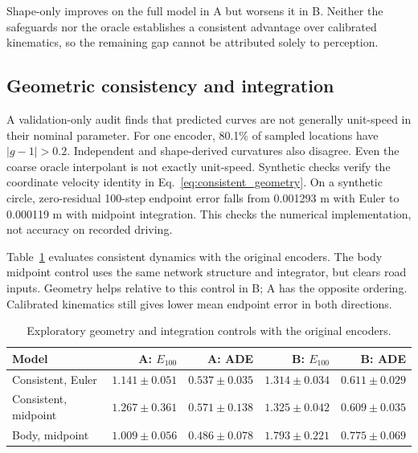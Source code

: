 \documentclass[preprint,12pt]{elsarticle}
\begin{document}
Shape-only improves on the full model in A but worsens it in B. Neither the
safeguards nor the oracle establishes a consistent advantage over calibrated
kinematics, so the remaining gap cannot be attributed solely to perception.

\subsection{Geometric consistency and integration}
A validation-only audit finds that predicted curves are not generally unit-speed
in their nominal parameter. For one encoder, 80.1\% of sampled locations have
$|g-1|>0.2$. Independent and shape-derived curvatures also disagree. Even the
coarse oracle interpolant is not exactly unit-speed. Synthetic checks verify
the coordinate velocity identity in Eq.~\eqref{eq:consistent_geometry}.
On a synthetic circle, zero-residual 100-step endpoint error falls from
0.001293 m with Euler to 0.000119 m with midpoint integration. This checks the
numerical implementation, not accuracy on recorded driving.

Table~\ref{tab:geometry} evaluates consistent dynamics with the original encoders.
The body midpoint control uses the same network structure and integrator, but
clears road inputs. Geometry helps relative to this control in B; A has the
opposite ordering. Calibrated kinematics still gives lower mean endpoint error
in both directions.
\begin{table}[t]
\centering
\caption{Exploratory geometry and integration controls with the original encoders.}
\label{tab:geometry}
\footnotesize
\setlength{\tabcolsep}{3pt}
\begin{tabular}{lrrrr}
\toprule
Model & A: $E_{100}$ & A: ADE & B: $E_{100}$ & B: ADE \\
\midrule
Consistent, Euler & $1.141 \pm 0.051$ & $0.537 \pm 0.035$ & $1.314 \pm 0.034$ & $0.611 \pm 0.029$ \\
Consistent, midpoint & $1.267 \pm 0.361$ & $0.571 \pm 0.138$ & $1.325 \pm 0.042$ & $0.609 \pm 0.035$ \\
Body, midpoint & $1.009 \pm 0.056$ & $0.486 \pm 0.078$ & $1.793 \pm 0.221$ & $0.775 \pm 0.069$ \\
\bottomrule
\end{tabular}
\end{table}
\end{document}
